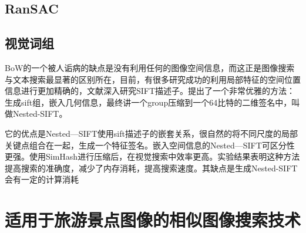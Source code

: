 \subsection{RanSAC}

\subsection{视觉词组}

BoW的一个被人诟病的缺点是没有利用任何的图像空间信息，而这正是图像搜索与文本搜索最显著的区别所在，目前，有很多研究成功的利用局部特征的空间位置信息进行更加精确的，文献\cite{Xu:2013wc}深入研究SIFT描述子。提出了一个非常优雅的方法：生成sift组，嵌入几何信息，最终讲一个group压缩到一个64比特的二维签名中，叫做Nested-SIFT。

它的优点是Nested—SIFT使用sift描述子的嵌套关系，很自然的将不同尺度的局部关键点组合在一起，生成一个特征签名。嵌入空间信息的Nested—SIFT可区分性更强。使用SimHash进行压缩后，在视觉搜索中效率更高。实验结果表明这种方法提高搜索的准确度，减少了内存消耗，提高搜索速度。其缺点是生成Nested-SIFT会有一定的计算消耗

\section{适用于旅游景点图像的相似图像搜索技术}

\ifx\usechapbib\empty
\nocite{BSTcontrol}


\fi